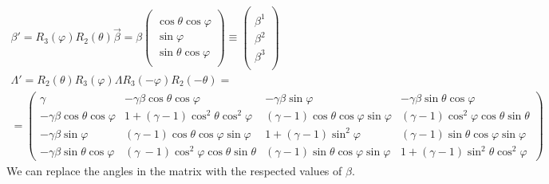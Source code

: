\documentclass{article}
\begin{document}
\begin{equation}
\begin{gathered}
    \beta' =  R_3(\varphi) R_2(\theta) \vec{\beta} = \beta\begin{pmatrix}
        \\
        \cos \theta \cos \varphi \\
        \sin \varphi \\
        \sin \theta \cos \varphi \\
    \end{pmatrix}
    \equiv
    \begin{pmatrix}
        \\
        \beta^1 \\
        \beta^2 \\
        \beta^3 \\
    \end{pmatrix}
    \\
    \Lambda' = R_2(\theta) R_3(\varphi) \Lambda R_3(-\varphi) R_2(-\theta) = 
    \\
    = \begin{pmatrix}
            \gamma &
            -\gamma\beta\cos\theta\cos\varphi &
            -\gamma\beta\sin\varphi &
            -\gamma\beta\sin\theta\cos\varphi
        \\
            -\gamma\beta\cos\theta\cos\varphi &
            1 + (\gamma - 1)\cos^2\theta\cos^2\varphi &
            (\gamma - 1)\cos\theta\cos\varphi\sin\varphi &
            (\gamma - 1)\cos^2\varphi\cos\theta\sin\theta
        \\
            -\gamma\beta\sin\varphi &
            (\gamma - 1)\cos\theta\cos\varphi\sin\varphi &
            1 + (\gamma - 1)\sin^2\varphi &
            (\gamma - 1)\sin\theta\cos\varphi\sin\varphi
        \\
            -\gamma\beta\sin\theta\cos\varphi &
            (\gamma\ - 1)\cos^2\varphi\cos\theta\sin\theta &
            (\gamma - 1) \sin\theta\cos\varphi\sin\varphi &
            1 + (\gamma - 1)\sin^2\theta\cos^2\varphi
    \end{pmatrix}
\end{gathered}
\end{equation}
We can replace the angles in the matrix with the respected values of $\beta$.
\end{document}
